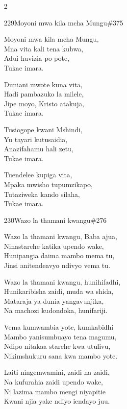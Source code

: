 \begin{multicols}{2}
\begin{hymn}{229}{Moyoni mwa kila mcha Mungu}{\#375}
\begin{stanza}
Moyoni mwa kila mcha Mungu,\\
Mna vita kali tena kubwa,\\
Adui huvizia po pote,\\
Tukae imara.
\end{stanza}
\begin{stanza}
Duniani mwote kuna vita,\\
Hadi pambazuko la milele,\\
Jipe moyo, Kristo atakuja,\\
Tukae imara.
\end{stanza}
\begin{stanza}
Tusiogope kwani Mshindi,\\
Yu tayari kutusaidia,\\
Anazifahamu hali zetu,\\
Tukae imara.
\end{stanza}
\begin{stanza}
Tuendelee kupiga vita,\\
Mpaka mwisho tupumzikapo,\\
Tutaziweka kando silaha,\\
Tukae imara.
\end{stanza}
\end{hymn}

\begin{hymn}{230}{Wazo la thamani kwangu}{\#276}
\begin{stanza}
Wazo la thamani kwangu, Baba ajua,\\
Ninastarehe katika upendo wake,\\
Hunipangia daima mambo mema tu,\\
Jinsi anitendeavyo ndivyo vema tu.
\end{stanza}
\begin{stanza}
Wazo la thamani kwangu, hunihifadhi,\\
Hunikaribisha zaidi, muda wa shida,\\
Mataraja ya dunia yangavunjika,\\
Na machozi kudondoka, hunifariji.
\end{stanza}
\begin{stanza}
Vema kumwambia yote, kumkabidhi\\
Mambo yanisumbuayo tena magumu,\\
Ndipo nitakaa starehe kwa utulivu,\\
Nikimshukuru sana kwa mambo yote.
\end{stanza}
\begin{stanza}
Laiti ningemwamini, zaidi na zaidi,\\
Na kufurahia zaidi upendo wake,\\
Ni lazima mambo mengi niyapitie\\
Kwani njia yake ndiyo iendayo juu.
\end{stanza}
\end{hymn}


\end{multicols}
